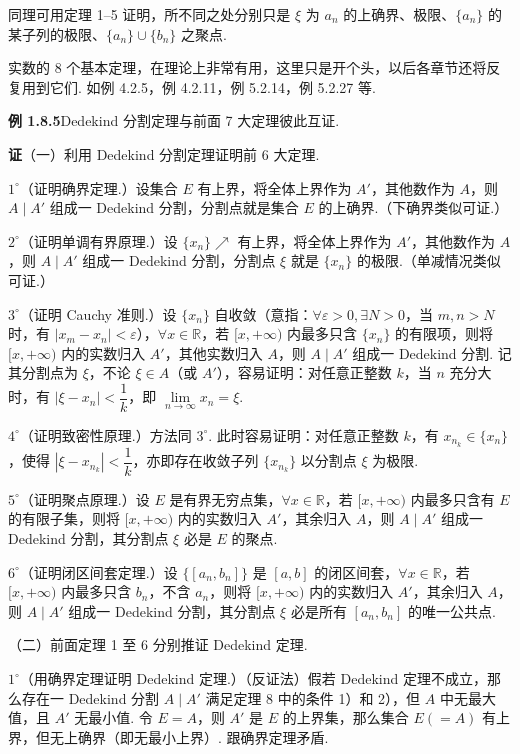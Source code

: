 \documentclass[UTF8, 12pt, fontset=fandol, oneside]{ctexart}
\begin{document}
同理可用定理 1--5 证明，所不同之处分别只是 $\xi$ 为 $a_n$ 的上确界、极限、$\{a_n\}$ 的某子列的极限、$\{a_n\}\cup\{b_n\}$ 之聚点.

实数的 8 个基本定理，在理论上非常有用，这里只是开个头，以后各章节还将反复用到它们. 如例 4.2.5，例 4.2.11，例 5.2.14，例 5.2.27 等.

\noindent\textbf{例 1.8.5}\quad Dedekind 分割定理与前面 7 大定理彼此互证.

\noindent\textbf{证}\quad （一）利用 Dedekind 分割定理证明前 6 大定理.

$1^\circ$（证明确界定理.）设集合 $E$ 有上界，将全体上界作为 $A'$，其他数作为 $A$，则 $A\mid A'$ 组成一 Dedekind 分割，分割点就是集合 $E$ 的上确界.（下确界类似可证.）

$2^\circ$（证明单调有界原理.）设 $\{x_n\}\nearrow$ 有上界，将全体上界作为 $A'$，其他数作为 $A$，则 $A\mid A'$ 组成一 Dedekind 分割，分割点 $\xi$ 就是 $\{x_n\}$ 的极限.（单减情况类似可证.）

$3^\circ$（证明 Cauchy 准则.）设 $\{x_n\}$ 自收敛（意指：$\forall \varepsilon>0,\exists N>0$，当 $m,n>N$ 时，有 $|x_m-x_n|<\varepsilon$），$\forall x\in\mathbb{R}$，若 $[x,+\infty)$ 内最多只含 $\{x_n\}$ 的有限项，则将 $[x,+\infty)$ 内的实数归入 $A'$，其他实数归入 $A$，则 $A\mid A'$ 组成一 Dedekind 分割. 记其分割点为 $\xi$，不论 $\xi\in A$（或 $A'$），容易证明：对任意正整数 $k$，当 $n$ 充分大时，有 $|\xi-x_n|<\dfrac1k$，即 $\lim\limits_{n\to\infty}x_n=\xi$.

$4^\circ$（证明致密性原理.）方法同 $3^\circ$. 此时容易证明：对任意正整数 $k$，有 $x_{n_k}\in\{x_n\}$，使得 $|\xi-x_{n_k}|<\dfrac1k$，亦即存在收敛子列 $\{x_{n_k}\}$ 以分割点 $\xi$ 为极限.

$5^\circ$（证明聚点原理.）设 $E$ 是有界无穷点集，$\forall x\in\mathbb{R}$，若 $[x,+\infty)$ 内最多只含有 $E$ 的有限子集，则将 $[x,+\infty)$ 内的实数归入 $A'$，其余归入 $A$，则 $A\mid A'$ 组成一 Dedekind 分割，其分割点 $\xi$ 必是 $E$ 的聚点.

$6^\circ$（证明闭区间套定理.）设 $\{[a_n,b_n]\}$ 是 $[a,b]$ 的闭区间套，$\forall x\in\mathbb{R}$，若 $[x,+\infty)$ 内最多只含 $b_n$，不含 $a_n$，则将 $[x,+\infty)$ 内的实数归入 $A'$，其余归入 $A$，则 $A\mid A'$ 组成一 Dedekind 分割，其分割点 $\xi$ 必是所有 $[a_n,b_n]$ 的唯一公共点.

（二）前面定理 1 至 6 分别推证 Dedekind 定理.

$1^\circ$（用确界定理证明 Dedekind 定理.）（反证法）假若 Dedekind 定理不成立，那么存在一 Dedekind 分割 $A\mid A'$ 满足定理 8 中的条件 1）和 2），但 $A$ 中无最大值，且 $A'$ 无最小值. 令 $E=A$，则 $A'$ 是 $E$ 的上界集，那么集合 $E(=A)$ 有上界，但无上确界（即无最小上界）. 跟确界定理矛盾.
\end{document}
